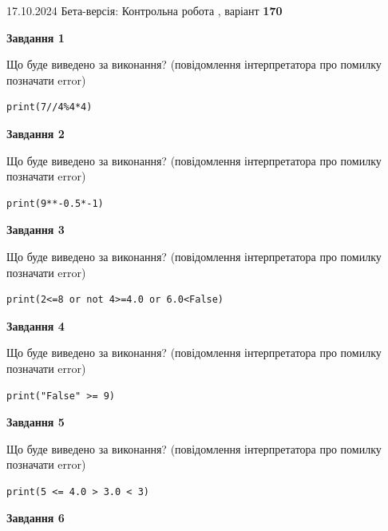 \documentclass[12pt, ukrainian]{article}
\begin{document}
{\Large{17.10.2024 Бета-версія: Контрольна робота , варіант  \No \textbf { 170 }\par}}
{
\begin {large}
{\begin {center}\textbf{Завдання 1}\end {center}}

Що буде виведено за виконання? (повідомлення інтерпретатора про помилку позначати error)\par
\begin{verbatim}
print(7//4%4*4)
\end{verbatim}

{\begin {center}\textbf{Завдання 2}\end {center}}

Що буде виведено за виконання? (повідомлення інтерпретатора про помилку позначати error)\par
\begin{verbatim}
print(9**-0.5*-1)
\end{verbatim}

{\begin {center}\textbf{Завдання 3}\end {center}}

Що буде виведено за виконання? (повідомлення інтерпретатора про помилку позначати error)\par
\begin{verbatim}
print(2<=8 or not 4>=4.0 or 6.0<False)
\end{verbatim}

{\begin {center}\textbf{Завдання 4}\end {center}}

Що буде виведено за виконання? (повідомлення інтерпретатора про помилку позначати error)\par
\begin{verbatim}
print("False" >= 9)
\end{verbatim}

{\begin {center}\textbf{Завдання 5}\end {center}}

Що буде виведено за виконання? (повідомлення інтерпретатора про помилку позначати error)\par
\begin{verbatim}
print(5 <= 4.0 > 3.0 < 3)
\end{verbatim}

{\begin {center}\textbf{Завдання 6}\end {center}}


\end{large}}
\end{document}
